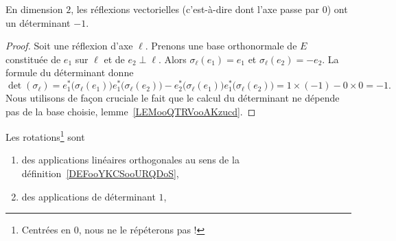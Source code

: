 \begin{lemma}       \label{LEMooSYZYooWDFScw}
    En dimension \( 2\), les réflexions vectorielles (c'est-à-dire dont l'axe passe par \( 0\)) ont un déterminant \( -1\).
\end{lemma}

\begin{proof}
    Soit une réflexion d'axe \( \ell\). Prenons une base orthonormale de \( E\) constituée de \( e_1\) sur \( \ell\) et de \( e_2\perp \ell\). Alors \( \sigma_{\ell}(e_1)=e_1\) et \( \sigma_{\ell}(e_2)=-e_2\). La formule du déterminant donne
    \begin{equation}
        \det(\sigma_{\ell})=e_1^*\big( \sigma_{\ell}(e_1) \big)e_1^*\big( \sigma_{\ell}(e_2) \big)-e_2^*\big( \sigma_{\ell}(e_1) \big)e_1^*\big( \sigma_{\ell}(e_2) \big)=1\times (-1)-0\times 0=-1.
    \end{equation}
    Nous utilisons de façon cruciale le fait que le calcul du déterminant ne dépende pas de la base choisie, lemme~\ref{LEMooQTRVooAKzucd}.
\end{proof}

\begin{proposition}     \label{PROPooTUJWooAjtEnQ}
    Les rotations\footnote{Centrées en \( 0\), nous ne le répéterons pas !} sont
    \begin{enumerate}
        \item
            des applications linéaires orthogonales au sens de la définition~\ref{DEFooYKCSooURQDoS},
        \item
             des applications de déterminant \( 1\),
    \end{enumerate}
\end{proposition}

